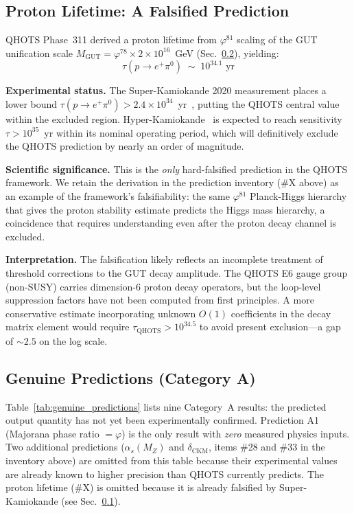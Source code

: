\documentclass[aps,prd,twocolumn,superscriptaddress,floatfix,nofootinbib]{revtex4-2}
\theoremstyle{definition}
\theoremstyle{remark}
\newcommand{\vp}{\varphi}
\begin{document}
\subsection{Proton Lifetime: A Falsified Prediction}
\label{sec:proton_lifetime_falsified}

QHOTS Phase~311 derived a proton lifetime from $\vp^{81}$ scaling of the GUT unification
scale $M_\text{GUT} = \vp^{78} \times 2 \times 10^{16}$~GeV (Sec.~\ref{sec:genuine_predictions}),
yielding:
\begin{equation}
\tau(p \to e^+\pi^0) \;\sim\; 10^{34.1}\text{ yr}
\end{equation}

\textbf{Experimental status.}  The Super-Kamiokande 2020 measurement places a lower bound
$\tau(p \to e^+\pi^0) > 2.4 \times 10^{34}$~yr~\cite{superk2020}, putting the QHOTS central
value within the excluded region.  Hyper-Kamiokande~\cite{hyperk} is expected to reach
sensitivity $\tau > 10^{35}$~yr within its nominal operating period, which will definitively
exclude the QHOTS prediction by nearly an order of magnitude.

\textbf{Scientific significance.}  This is the \emph{only} hard-falsified prediction in
the QHOTS framework.  We retain the derivation in the prediction inventory (\#X above)
as an example of the framework's falsifiability: the same $\vp^{81}$ Planck-Higgs hierarchy
that gives the proton stability estimate predicts the Higgs mass hierarchy, a coincidence that
requires understanding even after the proton decay channel is excluded.

\textbf{Interpretation.}  The falsification likely reflects an incomplete treatment of
threshold corrections to the GUT decay amplitude.  The QHOTS E6 gauge group (non-SUSY)
carries dimension-6 proton decay operators, but the loop-level suppression factors have not
been computed from first principles.  A more conservative estimate incorporating unknown
$O(1)$ coefficients in the decay matrix element would require $\tau_\text{QHOTS} > 10^{34.5}$
to avoid present exclusion---a gap of $\sim 2.5$ on the log scale.

\subsection{Genuine Predictions (Category A)}
\label{sec:genuine_predictions}

Table~\ref{tab:genuine_predictions} lists nine Category~A results: the predicted output
quantity has not yet been experimentally confirmed.  Prediction A1 (Majorana phase ratio $=\vp$)
is the only result with \emph{zero} measured physics inputs.  Two additional predictions
($\alpha_s(M_Z)$ and $\delta_\text{CKM}$, items \#28 and \#33 in the inventory above)
are omitted from this table because their experimental values are already known to higher
precision than QHOTS currently predicts.  The proton lifetime (\#X) is omitted because it
is already falsified by Super-Kamiokande (see Sec.~\ref{sec:proton_lifetime_falsified}).
\end{document}
